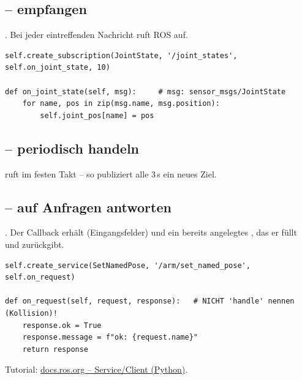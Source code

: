 \subsection{ -- empfangen}
. Bei jeder
eintreffenden Nachricht ruft ROS  auf.
\begin{lstlisting}[style=py]
self.create_subscription(JointState, '/joint_states', self.on_joint_state, 10)

def on_joint_state(self, msg):     # msg: sensor_msgs/JointState
    for name, pos in zip(msg.name, msg.position):
        self.joint_pos[name] = pos
\end{lstlisting}

\subsection{ -- periodisch handeln}
 ruft  im festen
Takt -- so publiziert  alle 3\,s ein neues Ziel.

\subsection{ -- auf Anfragen antworten}
. Der Callback erhält
 (Eingangsfelder) und ein bereits angelegtes , das er
füllt und zurückgibt.
\begin{lstlisting}[style=py]
self.create_service(SetNamedPose, '/arm/set_named_pose', self.on_request)

def on_request(self, request, response):   # NICHT 'handle' nennen (Kollision)!
    response.ok = True
    response.message = f"ok: {request.name}"
    return response
\end{lstlisting}
\noindent Tutorial: \href{https://docs.ros.org/en/jazzy/Tutorials/Beginner-Client-Libraries/Writing-A-Simple-Py-Service-And-Client.html}{docs.ros.org -- Service/Client (Python)}.


